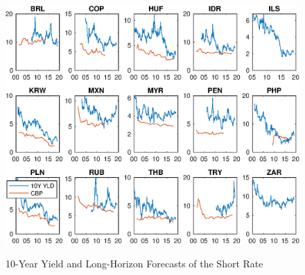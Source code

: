 \documentclass{article}
\begin{document}
\begin{figure}[tbph]
	\begin{center}
		\caption{10-Year Yield and Long-Horizon Forecasts of the Short Rate}
		\label{fig:YLD10Y_CBP}
		\includegraphics[trim={0cm 0cm 0cm 0cm},clip,height=1\textheight,width=1.4\textwidth]{../Figures/Data/YLD10Y_CBP.eps} \\
	\end{center}
\end{figure}
\end{document}
